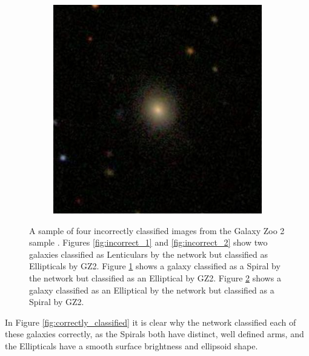 \documentclass[12pt, onecolumn]{aa}
\begin{document}
\begin{figure}[h]
\begin{subfigure}[t]{0.23\linewidth}
    \caption{}
    \label{fig:incorrect_3}
    \end{subfigure}
    \begin{subfigure}[t]{0.23\linewidth}
    \centering
    \includegraphics[width=\linewidth]{Figures/Wrongly_Classified/Elliptical/227447.jpg}
    \caption{}
    \label{fig:incorrect_4}
    \end{subfigure}
    
    \caption{A sample of four incorrectly classified images from the Galaxy Zoo 2 sample \citep{Willett2013}. Figures \ref{fig:incorrect_1} and \ref{fig:incorrect_2} show two galaxies classified as Lenticulars by the network but classified as Ellipticals by GZ2. Figure \ref{fig:incorrect_3} shows a galaxy classified as a Spiral by the network but classified as an Elliptical by GZ2. Figure \ref{fig:incorrect_4} shows a galaxy classified as an Elliptical by the network but classified as a Spiral by GZ2. }
    \label{fig:incorrectly_classified}
\end{figure}

In Figure \ref{fig:correctly_classified} it is clear why the network classified each of these galaxies correctly, as the Spirals both have distinct, well defined arms, and the Ellipticals have a smooth surface brightness and ellipsoid shape. 
\end{document}
